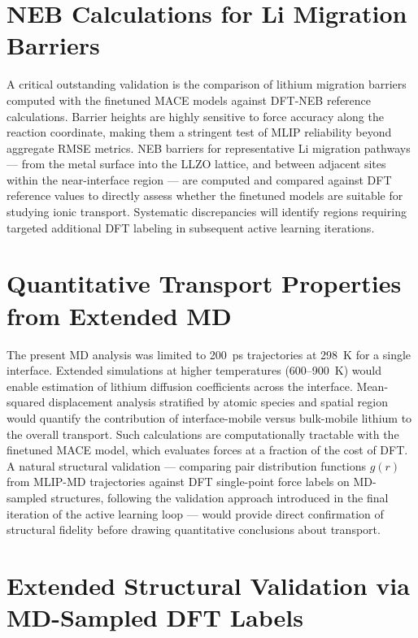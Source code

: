 \documentclass[12pt,a4paper,oneside]{book}
\begin{document}
\section{NEB Calculations for Li Migration Barriers}
A critical outstanding validation is the comparison of lithium migration barriers
computed with the finetuned MACE models against DFT-NEB reference calculations.
Barrier heights are highly sensitive to force accuracy along the reaction coordinate,
making them a stringent test of MLIP reliability beyond aggregate RMSE metrics.
NEB barriers for representative Li migration pathways --- from the metal surface into
the LLZO lattice, and between adjacent sites within the near-interface region --- are
computed and compared against DFT reference values to directly assess whether the
finetuned models are suitable for studying ionic transport. Systematic discrepancies
will identify regions requiring targeted additional DFT labeling in subsequent
active learning iterations.
\section{Quantitative Transport Properties from Extended MD}

The present MD analysis was limited to 200~ps trajectories at 298~K for a single
interface. Extended simulations at higher temperatures (600--900~K) would enable
estimation of lithium diffusion coefficients across the interface. Mean-squared
displacement analysis stratified by atomic species and spatial region would quantify
the contribution of interface-mobile versus bulk-mobile lithium to the overall
transport. Such calculations are computationally tractable with the finetuned MACE
model, which evaluates forces at a fraction of the cost of DFT. A natural
structural validation --- comparing pair distribution functions $g(r)$ from
MLIP-MD trajectories against DFT single-point force labels on MD-sampled
structures, following the validation approach introduced in the final iteration
of the active learning loop --- would provide direct confirmation of structural
fidelity before drawing quantitative conclusions about transport.
\section{Extended Structural Validation via MD-Sampled DFT Labels}
\end{document}

